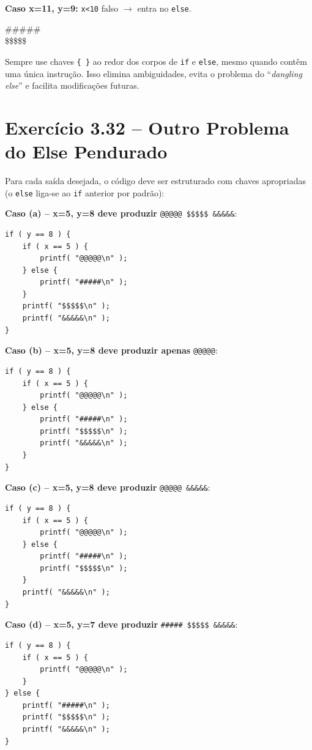 \documentclass[12pt,a4paper]{article}
\begin{document}
\begin{respostabox}
\textbf{Caso x=11, y=9:} \texttt{x<10} falso $\to$ entra no \texttt{else}.
\begin{saida}
\#\#\#\#\#\\
\$\$\$\$\$
\end{saida}

\begin{boaprática}
  Sempre use chaves \texttt{\{\ \}} ao redor dos corpos de \texttt{if} e
  \texttt{else}, mesmo quando contêm uma única instrução. Isso elimina
  ambiguidades, evita o problema do ``\textit{dangling else}'' e facilita
  modificações futuras.
\end{boaprática}
\end{respostabox}

\newpage

\section{Exercício 3.32 -- Outro Problema do Else Pendurado}

\begin{respostabox}
Para cada saída desejada, o código deve ser estruturado com chaves apropriadas
(o \texttt{else} liga-se ao \texttt{if} anterior por padrão):

\textbf{Caso (a) -- x=5, y=8 deve produzir} \texttt{@@@@@ \$\$\$\$\$ \&\&\&\&\&}:
\begin{lstlisting}
if ( y == 8 ) {
    if ( x == 5 ) {
        printf( "@@@@@\n" );
    } else {
        printf( "#####\n" );
    }
    printf( "$$$$$\n" );
    printf( "&&&&&\n" );
}
\end{lstlisting}

\textbf{Caso (b) -- x=5, y=8 deve produzir apenas} \texttt{@@@@@}:
\begin{lstlisting}
if ( y == 8 ) {
    if ( x == 5 ) {
        printf( "@@@@@\n" );
    } else {
        printf( "#####\n" );
        printf( "$$$$$\n" );
        printf( "&&&&&\n" );
    }
}
\end{lstlisting}

\textbf{Caso (c) -- x=5, y=8 deve produzir} \texttt{@@@@@ \&\&\&\&\&}:
\begin{lstlisting}
if ( y == 8 ) {
    if ( x == 5 ) {
        printf( "@@@@@\n" );
    } else {
        printf( "#####\n" );
        printf( "$$$$$\n" );
    }
    printf( "&&&&&\n" );
}
\end{lstlisting}

\textbf{Caso (d) -- x=5, y=7 deve produzir} \texttt{\#\#\#\#\# \$\$\$\$\$ \&\&\&\&\&}:
\begin{lstlisting}
if ( y == 8 ) {
    if ( x == 5 ) {
        printf( "@@@@@\n" );
    }
} else {
    printf( "#####\n" );
    printf( "$$$$$\n" );
    printf( "&&&&&\n" );
}
\end{lstlisting}
\end{respostabox}
\end{document}
